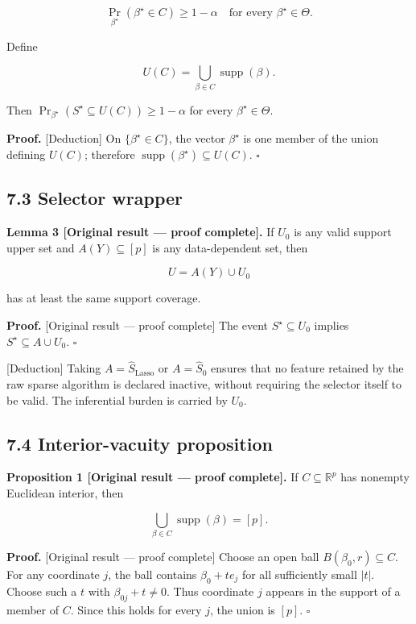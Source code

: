 \documentclass[
  english,
  11pt,
  a4paper,
]{article}
\newcounter{none} %
\begin{document}
$$
\Pr_{\beta^\star}(\beta^\star\in C)\ge1-\alpha
\quad\text{for every }\beta^\star\in\Theta.
$$

Define

$$
U(C)=\bigcup_{\beta\in C}\operatorname{supp}(\beta).
$$

Then $\Pr_{\beta^\star}(S^\star\subseteq U(C))\ge1-\alpha$ for every
$\beta^\star\in\Theta$.

\textbf{Proof.} {[}Deduction{]} On $\{\beta^\star\in C\}$, the vector
$\beta^\star$ is one member of the union defining $U(C)$; therefore
$\operatorname{supp}(\beta^\star)\subseteq U(C)$. $\square$

\subsection{7.3 Selector wrapper}\label{selector-wrapper}

\textbf{Lemma 3 {[}Original result --- proof complete{]}.} If $U_0$ is
any valid support upper set and $A(Y)\subseteq[p]$ is any
data-dependent set, then

$$
U=A(Y)\cup U_0
$$

has at least the same support coverage.

\textbf{Proof.} {[}Original result --- proof complete{]} The event
$S^\star\subseteq U_0$ implies $S^\star\subseteq A\cup U_0$.
$\square$

{[}Deduction{]} Taking $A=\widehat S_{\mathrm{Lasso}}$ or
$A=\widehat S_0$ ensures that no feature retained by the raw sparse
algorithm is declared inactive, without requiring the selector itself to
be valid. The inferential burden is carried by $U_0$.

\subsection{7.4 Interior-vacuity
proposition}\label{interior-vacuity-proposition}

\textbf{Proposition 1 {[}Original result --- proof complete{]}.} If
$C\subseteq\mathbb R^p$ has nonempty Euclidean interior, then

$$
\bigcup_{\beta\in C}\operatorname{supp}(\beta)=[p].
$$

\textbf{Proof.} {[}Original result --- proof complete{]} Choose an open
ball $B(\beta_0,r)\subseteq C$. For any coordinate $j$, the ball
contains $\beta_0+te_j$ for all sufficiently small $|t|$. Choose
such a $t$ with $\beta_{0j}+t\ne0$. Thus coordinate $j$ appears in
the support of a member of $C$. Since this holds for every $j$, the
union is $[p]$. $\square$
\end{document}

